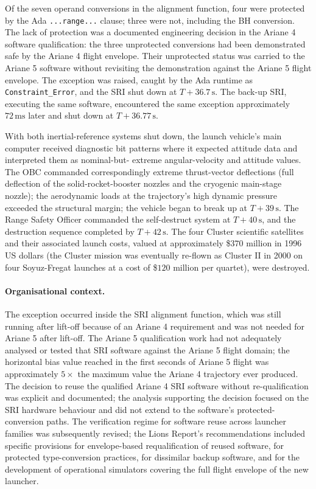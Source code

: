 Of the seven operand conversions in the alignment function, four
were protected by the Ada \texttt{...range...} clause; three were
not, including the BH conversion. The lack of protection was a
documented engineering decision in the Ariane 4 software
qualification: the three unprotected conversions had been
demonstrated safe by the Ariane 4 flight envelope. Their
unprotected status was carried to the Ariane 5 software without
revisiting the demonstration against the Ariane 5 flight envelope.
The exception was raised, caught by the Ada runtime as
\texttt{Constraint\_Error}, and the SRI shut down at
$T+36.7\,\si{\second}$. The back-up SRI, executing the same
software, encountered the same exception approximately $72\,\si{
\milli\second}$ later and shut down at $T+36.77\,\si{\second}$.

With both inertial-reference systems shut down, the launch
vehicle's main computer received diagnostic bit patterns where
it expected attitude data and interpreted them as nominal-but-
extreme angular-velocity and attitude values. The OBC commanded
correspondingly extreme thrust-vector deflections (full deflection
of the solid-rocket-booster nozzles and the cryogenic main-stage
nozzle); the aerodynamic loads at the trajectory's high dynamic
pressure exceeded the structural margin; the vehicle began to
break up at $T+39\,\si{\second}$. The Range Safety Officer
commanded the self-destruct system at $T+40\,\si{\second}$, and
the destruction sequence completed by $T+42\,\si{\second}$.
The four Cluster scientific satellites and their associated
launch costs, valued at approximately \$$370$ million in 1996
US dollars (the Cluster mission was eventually re-flown as
Cluster II in 2000 on four Soyuz-Fregat launches at a cost of
\$$120$ million per quartet), were destroyed.

\paragraph{Organisational context.} The exception occurred inside
the SRI alignment function, which was still running after lift-off
because of an Ariane 4 requirement and was not needed for Ariane 5
after lift-off. The Ariane 5 qualification work had not adequately
analysed or tested that SRI software against the Ariane 5 flight
domain; the horizontal bias value reached in the first seconds of
Ariane 5 flight was approximately $5 \times$ the maximum value the
Ariane 4 trajectory ever produced. The decision to reuse the
qualified Ariane 4 SRI software without re-qualification was
explicit and documented; the analysis supporting the decision
focused on the SRI hardware behaviour and did not extend to the
software's protected-conversion paths. The verification regime
for software reuse across launcher families was subsequently
revised; the Lions Report's recommendations included specific
provisions for envelope-based requalification of reused software,
for protected type-conversion practices, for dissimilar backup
software, and for the development of operational simulators
covering the full flight envelope of the new launcher.

